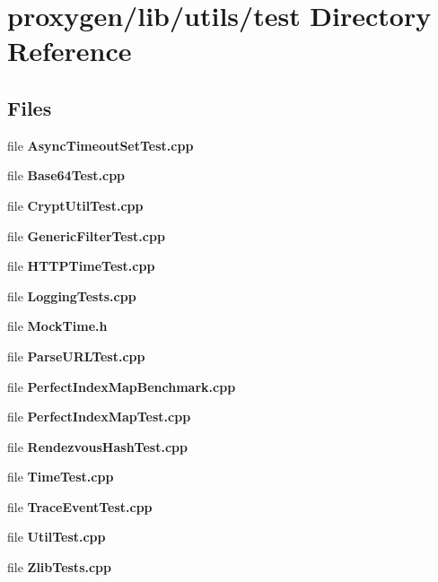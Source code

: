 \section{proxygen/lib/utils/test Directory Reference}
\label{dir_f6d3db6ab46074d6020d1e51afc101d0}
\subsection*{Files}
\begin{DoxyCompactItemize}
\item 
file {\bf Async\+Timeout\+Set\+Test.\+cpp}
\item 
file {\bf Base64\+Test.\+cpp}
\item 
file {\bf Crypt\+Util\+Test.\+cpp}
\item 
file {\bf Generic\+Filter\+Test.\+cpp}
\item 
file {\bf H\+T\+T\+P\+Time\+Test.\+cpp}
\item 
file {\bf Logging\+Tests.\+cpp}
\item 
file {\bf Mock\+Time.\+h}
\item 
file {\bf Parse\+U\+R\+L\+Test.\+cpp}
\item 
file {\bf Perfect\+Index\+Map\+Benchmark.\+cpp}
\item 
file {\bf Perfect\+Index\+Map\+Test.\+cpp}
\item 
file {\bf Rendezvous\+Hash\+Test.\+cpp}
\item 
file {\bf Time\+Test.\+cpp}
\item 
file {\bf Trace\+Event\+Test.\+cpp}
\item 
file {\bf Util\+Test.\+cpp}
\item 
file {\bf Zlib\+Tests.\+cpp}
\end{DoxyCompactItemize}
